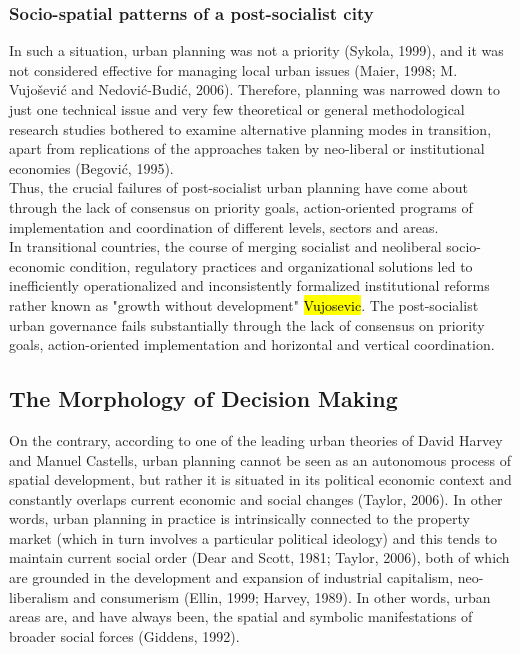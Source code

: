 \documentclass[11pt]{report}
\begin{document}
\subsubsection{Socio-spatial patterns of a post-socialist city}
In such a situation, urban planning was not a priority (Sykola, 1999), and it was not considered effective for managing local urban issues (Maier, 1998; M. Vujošević and Nedović-Budić, 2006). Therefore, planning was narrowed down to just one technical issue and very few theoretical or general methodological research studies bothered to examine alternative planning modes in transition, apart from replications of the approaches taken by neo-liberal or institutional economies (Begović, 1995).
\\
Thus, the crucial failures of post-socialist urban planning have come about through the lack of consensus on priority goals, action-oriented programs of implementation and coordination of different levels, sectors and areas. 
\\
In transitional countries, the course of merging socialist and neoliberal socio-economic condition, regulatory practices and organizational solutions led to inefficiently operationalized and inconsistently formalized institutional reforms rather known as "growth without development" \hl{Vujosevic}.
The post-socialist urban governance fails substantially through the lack of consensus on priority goals, action-oriented implementation and horizontal and vertical coordination.

\subsection{The Morphology of Decision Making}
On the contrary, according to one of the leading urban theories of David Harvey and Manuel Castells, urban planning cannot be seen as an autonomous process of spatial development, but rather it is situated in its political economic context and constantly overlaps current economic and social changes  (Taylor, 2006). In other words, urban planning in practice is intrinsically connected to the property market (which in turn involves a particular political ideology) and this tends to maintain current social order (Dear and Scott, 1981; Taylor, 2006), both of which are grounded in the development and expansion of industrial capitalism, neo-liberalism and consumerism (Ellin, 1999; Harvey, 1989). In other words, urban areas are, and have always been, the spatial and symbolic manifestations of broader social forces (Giddens, 1992).
\end{document}
